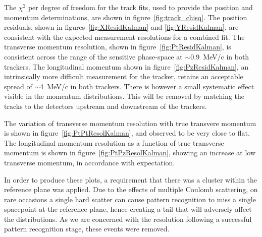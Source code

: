  The $\chi^2$ per degree of freedom for the track fits, used to provide the position and momentum determinations, are shown in figure~\ref{fig:track_chisq}. 
  The position residuals, shown in figures~\ref{fig:XResidKalman} and \ref{fig:YResidKalman}, are consistent with the expected measurement resolutions for a combined fit. The transverse momentum resolution, shown in figure~\ref{fig:PtResidKalman}, is consistent across the range of the sensitive phase-space at $\sim$0.9~MeV/c in both trackers. The longitudinal momentum shown in figure~\ref{fig:PzResidKalman}, an intrinsically more difficult measurement for the tracker, retains an acceptable spread of ${\sim}$4~MeV/c in both trackers. There is however a small systematic effect visible in the momentum distributions. This will be removed by matching the tracks to the detectors upstream and downstream of the trackers.
  
  The variation of transverse momentum resolution with true transvere momentum is shown in figure~\ref{fig:PtPtResolKalman}, and observed to be very close to flat. The longitudinal momentum resolution as a function of true transverse momentum is shown in figure~\ref{fig:PtPzResolKalman}, showing an increase at low transverse momentum, in accordance with expectation.

  In order to produce these plots, a requirement that there was a cluster within the reference plane was applied. Due to the effects of multiple Coulomb scattering, on rare occasions a single hard scatter can cause pattern recognition to miss a single spacepoint at the reference plane, hence creating a tail that will adversely affect the distributions. As we are concerned with the resolution following a successful pattern recognition stage, these events were removed.
  
 
